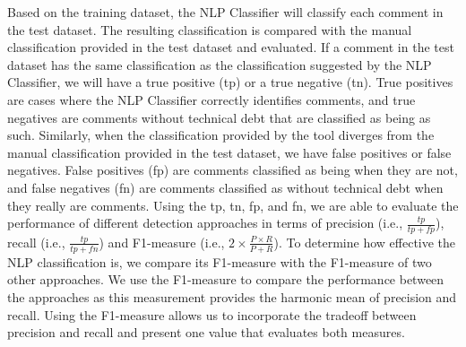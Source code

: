 
Based on the training dataset, the NLP Classifier will classify each comment in the test dataset. The resulting classification is compared with the manual classification provided in the test dataset and evaluated. If a comment in the test dataset has the same classification as the classification suggested by the NLP Classifier, we will have a true positive (tp) or a true negative (tn). True positives are cases where the NLP Classifier correctly identifies \SATD comments, and true negatives are comments without technical debt that are classified as being as such. Similarly, when the classification provided by the tool diverges from the manual classification provided in the test dataset, we have false positives or false negatives. False positives (fp) are comments classified as being \SATD when they are not, and false negatives (fn) are comments classified as without technical debt when they really are \SATD comments. Using the tp, tn, fp, and fn, we are able to evaluate the performance of different detection approaches in terms of precision (i.e., $\frac{tp}{tp + fp}$), recall (i.e., $\frac{tp}{tp + fn}$) and F1-measure (i.e., $2 \times \frac{P \times R}{P + R}$). To determine how effective the NLP classification is, we compare its F1-measure with the F1-measure of two other approaches. We use the F1-measure to compare the performance between the approaches as this measurement provides the harmonic mean of precision and recall. Using the F1-measure allows us to incorporate the tradeoff between precision and recall and present one value that evaluates both measures.

